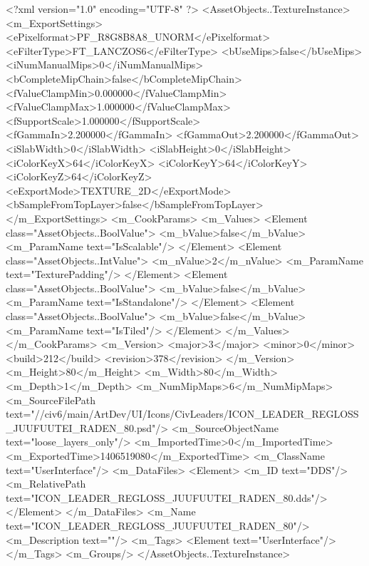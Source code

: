 <?xml version="1.0" encoding="UTF-8" ?>
<AssetObjects..TextureInstance>
	<m_ExportSettings>
		<ePixelformat>PF_R8G8B8A8_UNORM</ePixelformat>
		<eFilterType>FT_LANCZOS6</eFilterType>
		<bUseMips>false</bUseMips>
		<iNumManualMips>0</iNumManualMips>
		<bCompleteMipChain>false</bCompleteMipChain>
		<fValueClampMin>0.000000</fValueClampMin>
		<fValueClampMax>1.000000</fValueClampMax>
		<fSupportScale>1.000000</fSupportScale>
		<fGammaIn>2.200000</fGammaIn>
		<fGammaOut>2.200000</fGammaOut>
		<iSlabWidth>0</iSlabWidth>
		<iSlabHeight>0</iSlabHeight>
		<iColorKeyX>64</iColorKeyX>
		<iColorKeyY>64</iColorKeyY>
		<iColorKeyZ>64</iColorKeyZ>
		<eExportMode>TEXTURE_2D</eExportMode>
		<bSampleFromTopLayer>false</bSampleFromTopLayer>
	</m_ExportSettings>
	<m_CookParams>
		<m_Values>
			<Element class="AssetObjects..BoolValue">
				<m_bValue>false</m_bValue>
				<m_ParamName text="IsScalable"/>
			</Element>
			<Element class="AssetObjects..IntValue">
				<m_nValue>2</m_nValue>
				<m_ParamName text="TexturePadding"/>
			</Element>
			<Element class="AssetObjects..BoolValue">
				<m_bValue>false</m_bValue>
				<m_ParamName text="IsStandalone"/>
			</Element>
			<Element class="AssetObjects..BoolValue">
				<m_bValue>false</m_bValue>
				<m_ParamName text="IsTiled"/>
			</Element>
		</m_Values>
	</m_CookParams>
	<m_Version>
		<major>3</major>
		<minor>0</minor>
		<build>212</build>
		<revision>378</revision>
	</m_Version>
	<m_Height>80</m_Height>
	<m_Width>80</m_Width>
	<m_Depth>1</m_Depth>
	<m_NumMipMaps>6</m_NumMipMaps>
	<m_SourceFilePath text="//civ6/main/ArtDev/UI/Icons/CivLeaders/ICON_LEADER_REGLOSS_JUUFUUTEI_RADEN_80.psd"/>
	<m_SourceObjectName text="loose_layers_only"/>
	<m_ImportedTime>0</m_ImportedTime>
	<m_ExportedTime>1406519080</m_ExportedTime>
	<m_ClassName text="UserInterface"/>
	<m_DataFiles>
		<Element>
			<m_ID text="DDS"/>
			<m_RelativePath text="ICON_LEADER_REGLOSS_JUUFUUTEI_RADEN_80.dds"/>
		</Element>
	</m_DataFiles>
	<m_Name text="ICON_LEADER_REGLOSS_JUUFUUTEI_RADEN_80"/>
	<m_Description text=""/>
	<m_Tags>
		<Element text="UserInterface"/>
	</m_Tags>
	<m_Groups/>
</AssetObjects..TextureInstance>


